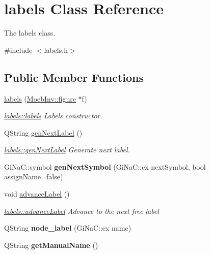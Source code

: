 \hypertarget{classlabels}{}\section{labels Class Reference}
\label{classlabels}


The labels class.  




{\ttfamily \#include $<$labels.\+h$>$}

\subsection*{Public Member Functions}
\begin{DoxyCompactItemize}
\item 
\mbox{\label{classlabels_a736d8b54b76c622c6ff937cd2cbdd767}} 
\mbox{\hyperlink{classlabels_a736d8b54b76c622c6ff937cd2cbdd767}{labels}} (\mbox{\hyperlink{class_moeb_inv_1_1figure}{Moeb\+Inv\+::figure}} $\ast$f)
\begin{DoxyCompactList}\small\item\em \mbox{\hyperlink{classlabels_a736d8b54b76c622c6ff937cd2cbdd767}{labels\+::labels}} Labels constructor. \end{DoxyCompactList}\item 
Q\+String \mbox{\hyperlink{classlabels_a70a7436dbef91e342fec4ec3130187e2}{gen\+Next\+Label}} ()
\begin{DoxyCompactList}\small\item\em \mbox{\hyperlink{classlabels_a70a7436dbef91e342fec4ec3130187e2}{labels\+::gen\+Next\+Label}} Generate next label. \end{DoxyCompactList}\item 
\mbox{\label{classlabels_aac459cce2911a18cf66175a6ccfb87f3}} 
Gi\+Na\+C\+::symbol {\bfseries gen\+Next\+Symbol} (Gi\+Na\+C\+::ex next\+Symbol, bool assign\+Name=false)
\item 
\mbox{\label{classlabels_a790344f0c86546b9b5fdda30dbe690a5}} 
void \mbox{\hyperlink{classlabels_a790344f0c86546b9b5fdda30dbe690a5}{advance\+Label}} ()
\begin{DoxyCompactList}\small\item\em \mbox{\hyperlink{classlabels_a790344f0c86546b9b5fdda30dbe690a5}{labels\+::advance\+Label}} Advance to the next free label \end{DoxyCompactList}\item 
\mbox{\label{classlabels_a87859b44a590675af2f05213e09e723e}} 
Q\+String {\bfseries node\+\_\+label} (Gi\+Na\+C\+::ex name)
\item 
\mbox{\label{classlabels_a629e15f96a5f73b4bfdb9b18b9b98092}} 
Q\+String {\bfseries get\+Manual\+Name} ()
\end{DoxyCompactItemize}
